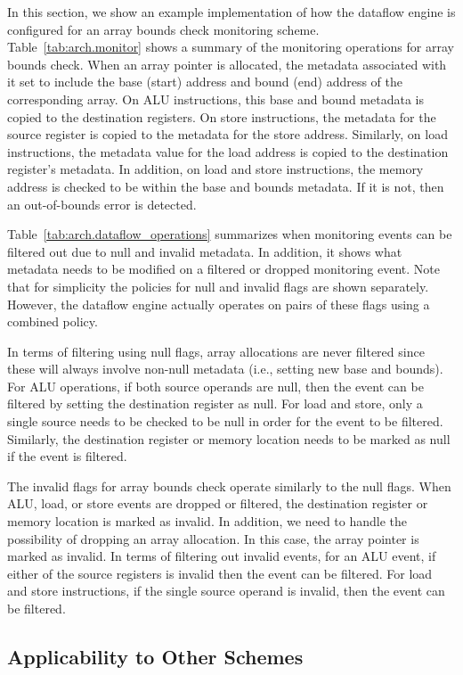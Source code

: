 In this section, we show an example implementation of how the dataflow engine
is configured for an array bounds check monitoring scheme.
Table~\ref{tab:arch.monitor} shows a summary of the monitoring operations for
array bounds check.  When an array pointer is allocated, the metadata
associated with it set to include the base (start) address and bound (end)
address of the corresponding array. On ALU instructions, this base and bound
metadata is copied to the destination registers. On store instructions, the
metadata for the source register is copied to the metadata for the store
address. Similarly, on load instructions, the metadata value for the load
address is copied to the destination register's metadata. In addition, on load
and store instructions, the memory address is checked to be within the base and
bounds metadata. If it is not, then an out-of-bounds error is detected. 

Table~\ref{tab:arch.dataflow_operations} summarizes when monitoring events
can be filtered out due to null and invalid metadata. In addition, it shows
what metadata needs to be modified on a filtered or dropped monitoring event.
Note that for simplicity the policies for null and invalid flags are shown
separately. However, the dataflow engine actually operates on pairs of these
flags using a combined policy.

In terms of filtering using null flags, array allocations are never filtered
since these will always involve non-null metadata (i.e., setting new base and
bounds). For ALU operations, if both source operands are null, then the event
can be filtered by setting the destination register as null. For load and
store, only a single source needs to be checked to be null in order for the
event to be filtered. Similarly, the destination register or memory location
needs to be marked as null if the event is filtered.

The invalid flags for array bounds check operate similarly to the null flags.
When ALU, load, or store events are dropped or filtered, the destination
register or memory location is marked as invalid. In addition, we need to
handle the possibility of dropping an array allocation. In this case, the array
pointer is marked as invalid. In terms of filtering out invalid events, for an
ALU event, if either of the source registers is invalid then the event can be
filtered. For load and store instructions, if the single source operand is
invalid, then the event can be filtered.

\subsection{Applicability to Other Schemes}

